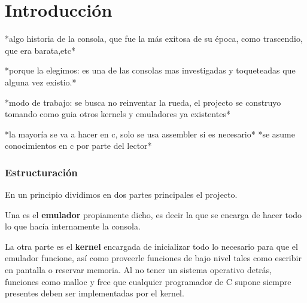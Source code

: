 \chapter{Introducción}
*algo historia de la consola, que fue la más exitosa de su época, como trascendio, que era barata,etc*

*porque la elegimos: es una de las consolas mas investigadas y toqueteadas que alguna vez existio.*

*modo de trabajo: se busca no reinventar la rueda, el projecto se construyo tomando como guia otros kernels y emuladores ya existentes*

*la mayoría se va a hacer en c, solo se usa assembler si es necesario*
*se asume conocimientos en c por parte del lector*

\subsection{Estructuración}

En un principio dividimos en dos partes principales el projecto.

Una es el \textbf{emulador} propiamente dicho, es decir la que se encarga de hacer todo lo que hacía internamente la consola.

La otra parte es el \textbf{kernel} encargada de inicializar todo lo necesario para que el emulador funcione, así como proveerle funciones de bajo nivel tales como escribir en pantalla o reservar memoria. Al no tener un sistema operativo detrás, funciones como malloc y free que cualquier programador de C supone siempre presentes deben ser implementadas por el kernel.
